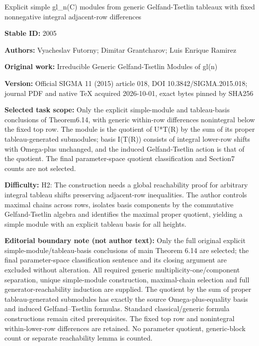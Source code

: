 \documentclass[11pt]{article}
\numberwithin{equation}{section}
\begin{document}
\begin{center}\Large Explicit simple gl\_n(C) modules from generic Gelfand-Tsetlin tableaux with fixed nonnegative integral adjacent-row differences\end{center}
\noindent\textbf{Stable ID:} 2005\par
\noindent\textbf{Authors:} Vyacheslav Futorny; Dimitar Grantcharov; Luis Enrique Ramirez\par
\noindent\textbf{Original work:} Irreducible Generic Gelfand-Tsetlin Modules of gl(n)\par
\noindent\textbf{Version:} Official SIGMA 11 (2015) article 018, DOI 10.3842/SIGMA.2015.018; journal PDF and native TeX acquired 2026-10-01, exact bytes pinned by SHA256\par
\noindent\textbf{Selected task scope:} Only the explicit simple-module and tableau-basis conclusions of Theorem6.14, with generic within-row differences nonintegral below the fixed top row. The module is the quotient of U*\allowbreak{}T(R) by the sum of its proper tableau-generated submodules; basis I(T(R)) consists of integral lower-row shifts with Omega-plus unchanged, and the induced Gelfand-Tsetlin action is that of the quotient. The final parameter-space quotient classification and Section7 counts are not selected.\par
\noindent\textbf{Difficulty:} H2: The construction needs a global reachability proof for arbitrary integral tableau shifts preserving adjacent-row inequalities. The author controls maximal chains across rows, isolates basis components by the commutative Gelfand-Tsetlin algebra and identifies the maximal proper quotient, yielding a simple module with an explicit tableau basis for all heights.\par
\noindent\textbf{Editorial boundary note (not author text):} Only the full original explicit simple-module/tableau-basis conclusions of main Theorem 6.14 are selected; the final parameter-space classification sentence and its closing argument are excluded without alteration. All required generic multiplicity-one/component separation, unique simple-module construction, maximal-chain selection and full generator-reachability induction are supplied. The quotient by the sum of proper tableau-generated submodules has exactly the source Omega-plus-equality basis and induced Gelfand–Tsetlin formulas. Standard classical/generic formula constructions remain cited prerequisites. The fixed top row and nonintegral within-lower-row differences are retained. No parameter quotient, generic-block count or separate reachability lemma is counted.\par
\end{document}
